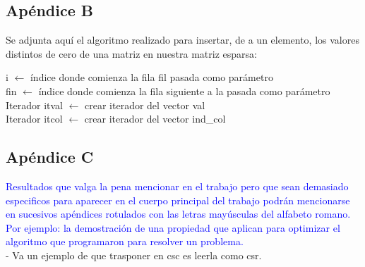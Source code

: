 \documentclass[a4paper]{article}
\begin{document}
	\subsection{Ap\'endice B}
Se adjunta aqu\'i el algoritmo realizado para insertar, de a un elemento, los valores distintos de cero de una matriz en nuestra matriz esparsa: \\

\IncMargin{1em}
\begin{algorithm}

\BlankLine

i $\leftarrow$ \'indice donde comienza la fila fil pasada como par\'ametro \\
fin $\leftarrow$ \'indice donde comienza la fila siguiente a la pasada como par\'ametro \\
Iterador itval $\leftarrow$ crear iterador del vector val \\
Iterador itcol $\leftarrow$ crear iterador del vector ind_col \\
\end{algorithm}\DecMargin{1em}
	\subsection{Ap\'endice C}
\textcolor{blue}{Resultados que valga la pena mencionar en el trabajo pero que sean demasiado especificos para
aparecer en el cuerpo principal del trabajo podr\'an mencionarse en sucesivos ap\'endices
rotulados con las letras may\'usculas del alfabeto romano. Por ejemplo: la demostraci\'on
de una propiedad que aplican para optimizar el algoritmo que programaron para resolver
un problema.}\\
- Va un ejemplo de que trasponer en csc es leerla como csr.\\
\end{document}
